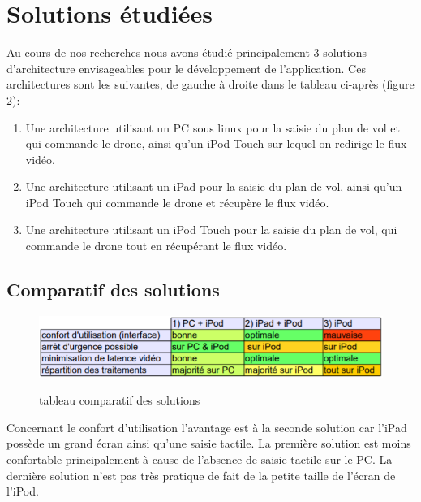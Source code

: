 \documentclass{article}
\begin{document}
\section{Solutions étudiées}
	Au cours de nos recherches nous avons étudié principalement 3 solutions d'architecture envisageables pour le développement de l'application. Ces architectures sont les suivantes, de gauche à droite dans le tableau ci-après (figure 2): 
	  	\begin{enumerate}
        	\item Une architecture utilisant un PC sous linux pour la saisie du plan de vol et qui commande le drone, ainsi qu'un iPod Touch sur lequel on redirige le flux vidéo.
        	\item Une architecture utilisant un iPad pour la saisie du plan de vol, ainsi qu'un iPod Touch qui commande le drone et récupère le flux vidéo.
         	\item Une architecture utilisant un iPod Touch pour la saisie du plan de vol, qui commande le drone tout en récupérant le flux vidéo.\\
        \end{enumerate}
	\subsection{Comparatif des solutions}
	
		\begin{figure}[h]
		\begin{center}
		\includegraphics{comparatif_v3.PNG}\\
		\caption{tableau comparatif des solutions}
		\end{center}
		\end{figure}
		


		\indent Concernant le confort d'utilisation l'avantage est à la seconde solution car l'iPad possède un grand écran ainsi qu'une saisie tactile. La première solution est moins confortable principalement à cause de l'absence de saisie tactile sur le PC. La dernière solution n'est pas très pratique de fait de la petite taille de l'écran de l'iPod.\\
		
\end{document}
